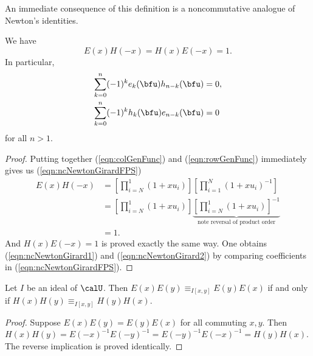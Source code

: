 \documentclass{article}
\begin{document}
An immediate consequence of this definition is a noncommutative analogue of Newton's identities.

\begin{proposition}
    We have
    \begin{equation}
        \label{eqn:ncNewtonGirardFPS}
        E(x)H(-x) = H(x)E(-x) = 1.
    \end{equation}
    In particular,
    \begin{align}
        \label{eqn:ncNewtonGirard1}
        \sum_{k=0}^n (-1)^ke_k(\bfu)h_{n-k}(\bfu) 
        &= 
        0, \\
        \label{eqn:ncNewtonGirard2}
        \sum_{k=0}^n (-1)^kh_k(\bfu)e_{n-k}(\bfu) 
        &= 
        0
    \end{align}
    for all $n > 1$.
\end{proposition}

\begin{proof}
    Putting together (\ref{eqn:colGenFunc}) and (\ref{eqn:rowGenFunc}) immediately gives us (\ref{eqn:ncNewtonGirardFPS})
    \begin{align*}
        E(x)H(-x)
        &=
        \left[
            \prod_{i=N}^1
            (1+xu_i)
        \right]
        \left[
            \prod_{i=1}^N
            (1+xu_i)^{-1}
        \right]
        \\
        &=
        \left[
            \prod_{i=N}^1
            (1+xu_i)
        \right]
        \underbrace{
            \left[
                \prod_{i=N}^1
                (1+xu_i)
            \right]^{-1}
        }_{\text{note reversal of product order}}
        \\
        &=
        1.
    \end{align*}
    And $H(x)E(-x)=1$ is proved exactly the same way.
    One obtains (\ref{eqn:ncNewtonGirard1}) and (\ref{eqn:ncNewtonGirard2}) by comparing coefficients in (\ref{eqn:ncNewtonGirardFPS}).
\end{proof}



\begin{corollary}
    \label{corr:ECommutesIffHCommutes}
    Let $I$ be an ideal of $\calU$.
    Then $E(x)E(y) \equiv_{I[x,y]} E(y)E(x)$ if and only if $H(x)H(y) \equiv_{I[x,y]} H(y)H(x)$.
\end{corollary}

\begin{proof}
    Suppose $E(x)E(y) = E(y)E(x)$ for all commuting $x,y$.
    Then $H(x)H(y) = E(-x)^{-1}E(-y)^{-1} = E(-y)^{-1}E(-x)^{-1} = H(y)H(x)$.
    The reverse implication is proved identically.
\end{proof}
\end{document}
